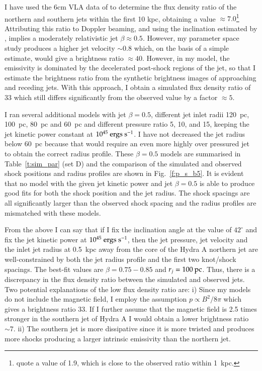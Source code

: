 I have used the 6cm VLA data of \citet{taylor90} to determine the flux density ratio of the northern and southern jets within the first 10 kpc, obtaining  a value $\approx 7.0$\footnote{\citet{taylor90} quote a value of 1.9, which is close to the observed ratio within 1~kpc.} Attributing this ratio to Doppler beaming, and using the inclination estimated by \citet{taylor90}, implies a moderately relativistic jet  $\beta \approx  0.5$. However, my parameter space study produces a higher jet velocity $\sim 0.8$ which, on the basis of a simple estimate, would give a brightness ratio $\approx 40$. However, in my model, the emissivity is dominated by the decelerated post-shock regions of the jet, so that I estimate the brightness ratio from the synthetic brightness images of approaching and receding jets. With this approach, I obtain a simulated flux density ratio of 33 which still differs significantly from the observed value by a factor $\approx 5$.

I ran several additional models with jet $\beta = 0.5$,  different jet inlet radii 120~pc, 100~pc, 80~pc and 60~pc and different pressure ratio 5, 10, and 15, keeping the jet kinetic power constant at $10^{45} \rm \ ergs \ s^{-1}$. I have not decreased the jet radius below 60~pc because that would require an even more highly over pressured jet to obtain the correct radius profile. These $\beta=0.5$ models are summarised in Table~\ref{t:sim_par} (set D) and the comparison of the simulated and observed shock positions and radius profiles are shown in Fig.~\ref{f:p_s_b5}. It is evident that no model with the given jet kinetic power and jet $\beta = 0.5$ is able to produce good fits for both the shock position and the jet radius. The shock spacings are all significantly larger than the observed shock spacing and the radius profiles are mismatched with these models. 

From the above I can say that if I fix the inclination angle at the \citet{taylor90} value of $42^\circ$ and fix the jet kinetic power at $10^{45} \rm \ ergs \ s^{-1}$, then the jet pressure, jet velocity and the inlet jet radius at 0.5~kpc away from the core of the Hydra A northern jet are well-constrained by both the jet radius profile and the first two knot/shock spacings. The best-fit values are $\beta = 0.75 - 0.85$ and $r_j = 100 \> \rm pc$. Thus, there is a discrepancy in the flux density ratio between the simulated and observed jets. Two potential explanations of the low flux density ratio are: i) Since my models do not include the magnetic field, I employ the assumption $p\propto B^2/8\pi$ which gives a brightness ratio 33. If I further assume that the magnetic field is 2.5 times stronger in the southern jet of Hydra A I would obtain a lower brightness ratio $\sim 7$. ii) The southern jet is more dissipative since it is more twisted and produces more shocks producing a larger intrinsic emissivity than the northern jet. 


